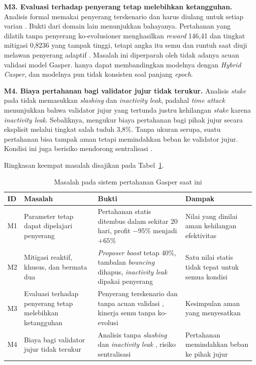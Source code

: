 \textbf{M3. Evaluasi terhadap penyerang tetap melebihkan ketangguhan.} Analisis formal memakai penyerang terskenario dan harus diulang untuk setiap varian \parencite{laneve2025stochastic}. Bukti dari domain lain menunjukkan bahayanya. Pertahanan yang dilatih tanpa penyerang ko-evolusioner menghasilkan \textit{reward} 146,41 dan tingkat mitigasi 0,8236 yang tampak tinggi, tetapi angka itu semu dan runtuh saat diuji melawan penyerang adaptif \parencite{wushishi2026coadam}. Masalah ini diperparah oleh tidak adanya acuan validasi model Gasper. \textcite{laneve2025stochastic} hanya dapat membandingkan modelnya dengan \textit{Hybrid Casper}, dan modelnya pun tidak konsisten soal panjang \textit{epoch}.

\textbf{M4. Biaya pertahanan bagi validator jujur tidak terukur.} Analisis \textit{stake} pada \textcite{laneve2025stochastic} tidak memasukkan \textit{slashing} dan \textit{inactivity leak}, padahal \textit{time attack} menunjukkan bahwa validator jujur yang tertunda justru kehilangan \textit{stake} karena \textit{inactivity leak}. Sebaliknya, \textcite{skowronski2026adaptive} mengukur biaya pertahanan bagi pihak jujur secara eksplisit melalui tingkat salah tuduh 3,8\%. Tanpa ukuran serupa, suatu pertahanan bisa tampak aman tetapi memindahkan beban ke validator jujur. Kondisi ini juga berisiko mendorong sentralisasi \parencite{rizal2025enhancing}.

Ringkasan keempat masalah disajikan pada Tabel~\ref{tab:masalah}.

\begin{table}[htbp]
\centering
\caption{Masalah pada sistem pertahanan Gasper saat ini}
\label{tab:masalah}
\small
\begin{tabular}{|p{0.7cm}|p{3.0cm}|p{4.7cm}|p{3.8cm}|}
\hline
\textbf{ID} & \textbf{Masalah} & \textbf{Bukti} & \textbf{Dampak} \\
\hline
M1 & Parameter tetap dapat dipelajari penyerang & Pertahanan statis ditembus dalam sekitar 20 hari, profit $-95\%$ menjadi $+65\%$ \parencite{skowronski2026adaptive} & Nilai yang dinilai aman kehilangan efektivitas \\
\hline
M2 & Mitigasi reaktif, khusus, dan bermata dua & \textit{Proposer boost} tetap 40\%, tambalan \textit{bouncing} dihapus, \textit{inactivity leak} dipakai penyerang \parencite{laneve2025stochastic} & Satu nilai statis tidak tepat untuk semua kondisi \\
\hline
M3 & Evaluasi terhadap penyerang tetap melebihkan ketangguhan & Penyerang terskenario dan tanpa acuan validasi \parencite{laneve2025stochastic}, kinerja semu tanpa ko-evolusi \parencite{wushishi2026coadam} & Kesimpulan aman yang menyesatkan \\
\hline
M4 & Biaya bagi validator jujur tidak terukur & Analisis tanpa \textit{slashing} dan \textit{inactivity leak} \parencite{laneve2025stochastic}, risiko sentralisasi \parencite{rizal2025enhancing} & Pertahanan memindahkan beban ke pihak jujur \\
\hline
\end{tabular}
\end{table}

